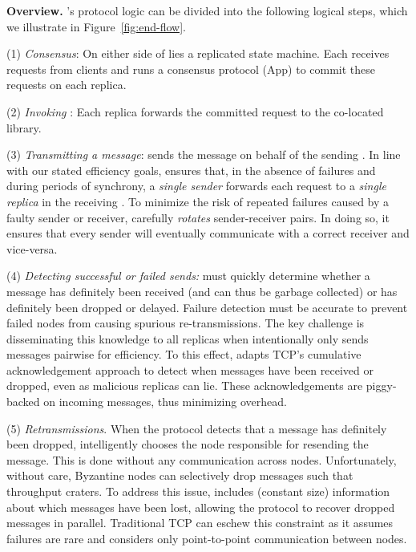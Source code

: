 \par \textbf{Overview.}  \Scrooge{}'s protocol logic can be  divided into the following logical steps, which we illustrate in Figure~\ref{fig:end-flow}.
\par (1) \textit{Consensus}:  On either side of \Scrooge{} lies a replicated state machine.  Each \RSM{} receives requests from clients and runs a consensus protocol (App) to commit these requests on each \RSM{} replica.
\par (2) \textit{Invoking \Scrooge{}}: Each replica forwards the committed request to the co-located \Scrooge{} library.
\par (3) \textit{Transmitting a message}: \Scrooge{} sends the message on behalf of the sending \RSM{}. In line with our stated efficiency goals, \Scrooge{} ensures that, in the absence of failures and during periods of synchrony, a \textit{single sender} forwards each request to a \textit{single replica} in the receiving \RSM{}. To minimize the risk of repeated failures caused by a faulty sender or receiver, \Scrooge{} carefully {\em rotates} sender-receiver pairs. In doing so, it ensures that every sender will eventually communicate with a correct receiver and vice-versa.
\par (4) \textit{Detecting successful or failed sends:} 
 \Scrooge{} must quickly determine whether a message has definitely been received (and can thus be garbage collected) or has definitely been dropped or delayed. 
Failure detection must be accurate to prevent failed nodes from causing spurious re-transmissions. The key challenge is disseminating this knowledge to all replicas when \Scrooge{} intentionally only sends messages pairwise for efficiency. To this effect, \Scrooge{} adapts TCP's cumulative acknowledgement approach to detect when messages have been received or dropped, even as malicious replicas can lie. These acknowledgements are piggy-backed on incoming messages, thus minimizing overhead. 
\par (5) \textit{Retransmissions}. When the protocol detects that a message has definitely been dropped, \Scrooge{} intelligently chooses the node responsible for resending the message. This is done without any communication across nodes. Unfortunately, without care, Byzantine nodes can selectively drop messages such that throughput craters. To address this issue, \Scrooge{}  includes (constant size) information about which messages have been lost, allowing the protocol to recover dropped messages in parallel. 
Traditional TCP can eschew this constraint as it assumes failures are rare and considers only point-to-point communication between nodes.



